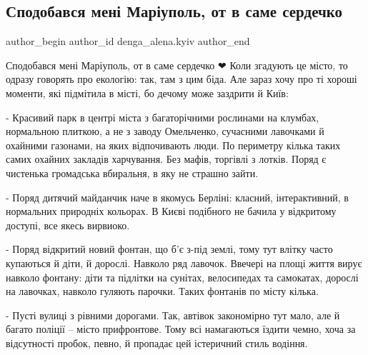  
 
 
 
 

\subsection{Сподобався мені Маріуполь, от в саме сердечко}
\label{sec:10_06_2021.fb.denga_alena.kyiv.1.spodobavsya_men__mar}

\ifcmt
 author_begin
   author_id denga_alena.kyiv
 author_end
\fi

Сподобався мені Маріуполь, от в саме сердечко ❤ Коли згадують це місто, то
одразу говорять про екологію: так, там з цим біда. Але зараз хочу про ті хороші
моменти, які підмітила в місті, бо дечому може заздрити й Київ:

- Красивий парк в центрі міста з багаторічними рослинами на клумбах, нормальною
плиткою, а не з заводу Омельченко, сучасними лавочками й охайними газонами, на
яких відпочивають люди. По периметру кілька таких самих охайних закладів
харчування. Без мафів, торгівлі з лотків. Поряд є чистенька громадська
вбиральня, в яку не страшно зайти. 

- Поряд дитячий майданчик наче в якомусь Берліні: класний, інтерактивний, в
нормальних природніх кольорах. В Києві подібного не бачила у відкритому
доступі, все якесь вирвиоко.

- Поряд відкритий новий фонтан, що б'є з-під землі, тому тут влітку часто
купаються й діти, й дорослі. Навколо ряд лавочок. Ввечері на площі життя вирує
навколо фонтану: діти та підлітки на сунітах, велосипедах та самокатах, дорослі
на лавочках, навколо гуляють парочки. Таких фонтанів по місту кілька.

- Пусті вулиці з рівними дорогами. Так, автівок закономірно тут мало, але й
багато поліції – місто прифронтове. Тому всі намагаються їздити чемно, хоча за
відсутності пробок, певно, й пропадає цей істеричний стиль водіння.


